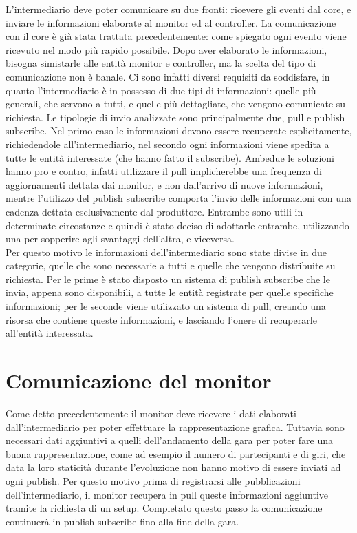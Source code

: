 L’intermediario deve poter comunicare su due fronti: ricevere gli eventi dal core, e inviare le informazioni elaborate al monitor ed al controller.
La comunicazione con il core è già stata trattata precedentemente: come spiegato ogni evento viene ricevuto nel modo più rapido possibile.
Dopo aver elaborato le informazioni, bisogna simistarle alle entità monitor e controller, ma la scelta del tipo di comunicazione non è banale.
Ci sono infatti diversi requisiti da soddisfare, in quanto l’intermediario è in possesso di due tipi di informazioni: quelle più generali, che servono a tutti, e quelle più dettagliate, che vengono comunicate su richiesta.
Le tipologie di invio analizzate sono principalmente due, pull e publish subscribe. Nel primo caso le informazioni devono essere recuperate esplicitamente, richiedendole all’intermediario, nel secondo ogni informazioni viene spedita a tutte le entità interessate (che hanno fatto il subscribe).
Ambedue le soluzioni hanno pro e contro, infatti utilizzare il pull implicherebbe una frequenza di aggiornamenti dettata dai monitor, e non dall’arrivo di nuove informazioni, mentre l’utilizzo del publish subscribe comporta l'invio delle informazioni con una cadenza dettata esclusivamente dal produttore.
Entrambe sono utili in determinate circostanze e quindi è stato deciso di adottarle entrambe, utilizzando una per sopperire agli svantaggi dell’altra, e viceversa.\\
Per questo motivo le informazioni dell’intermediario sono state divise in due categorie, quelle che sono necessarie a tutti e quelle che vengono distribuite su richiesta. Per le prime è stato disposto un sistema di publish subscribe che le invia, appena sono disponibili, a tutte le entità registrate per quelle specifiche informazioni; per le seconde viene utilizzato un sistema di pull, creando una risorsa che contiene queste informazioni, e lasciando l’onere di recuperarle all’entità interessata.


\section{Comunicazione del monitor}

Come detto precedentemente il monitor deve ricevere i dati elaborati dall’intermediario per poter effettuare la rappresentazione grafica.
Tuttavia sono necessari dati aggiuntivi a quelli dell’andamento della gara per poter fare una buona rappresentazione, come ad esempio il numero di partecipanti e di giri, che data la loro staticità durante l’evoluzione non hanno motivo di essere inviati ad ogni publish. Per questo motivo prima di registrarsi alle pubblicazioni dell’intermediario, il monitor recupera in pull queste informazioni aggiuntive tramite la richiesta di un setup.
Completato questo passo la comunicazione continuerà in publish subscribe fino alla fine della gara.


